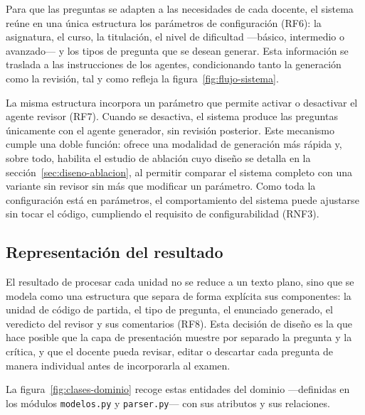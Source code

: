 Para que las preguntas se adapten a las necesidades de cada docente, el
sistema reúne en una única estructura los parámetros de configuración
(RF6): la asignatura, el curso, la titulación, el nivel de dificultad
---básico, intermedio o avanzado--- y los tipos de pregunta que se desean
generar. Esta información se traslada a las
instrucciones de los agentes, condicionando tanto la generación como la
revisión, tal y como refleja la figura~\ref{fig:flujo-sistema}.

La misma estructura incorpora un parámetro que permite activar o desactivar
el agente revisor (RF7). Cuando se desactiva, el sistema produce las
preguntas únicamente con el agente generador, sin revisión posterior. Este
mecanismo cumple una doble función: ofrece una modalidad de generación más
rápida y, sobre todo, habilita el estudio de ablación cuyo diseño se detalla en la
sección~\ref{sec:diseno-ablacion}, al permitir comparar el sistema completo con
una variante sin revisor sin más que modificar un parámetro. Como toda
la configuración está en parámetros, el comportamiento del
sistema puede ajustarse sin tocar el código, cumpliendo el requisito
de configurabilidad (RNF3).

\subsection{Representación del resultado}
\label{sec:diseno-resultado}

El resultado de procesar cada unidad no se reduce a un texto plano, sino
que se modela como una estructura que separa de forma explícita sus
componentes: la unidad de código de partida, el tipo de pregunta, el
enunciado generado, el veredicto del revisor y sus comentarios (RF8). Esta
decisión de diseño es la que hace posible que la capa de presentación
muestre por separado la pregunta y la crítica, y que el docente pueda
revisar, editar o descartar cada pregunta de manera individual antes de
incorporarla al examen.

La figura~\ref{fig:clases-dominio} recoge estas entidades del dominio
---definidas en los módulos \texttt{modelos.py} y \texttt{parser.py}--- con sus
atributos y sus relaciones.

